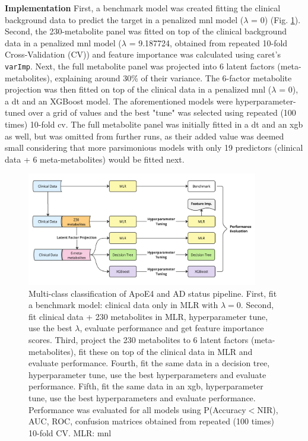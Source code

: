 \documentclass{amsart}
\begin{document}
\leavevmode\newline \textbf{Implementation}\hspace{.25cm} First, a benchmark model was created fitting the clinical background data to predict the target in a penalized \acrshort{mnl} model ($\lambda$ = 0) (Fig. \ref{fig:flow}). Second, the 230-metabolite panel was fitted on top of the clinical background data in a penalized \acrshort{mnl} model ($\lambda$ = 9.187724, obtained from repeated 10-fold Cross-Validation (CV)) and feature importance was calculated using \textsf{caret}'s \texttt{varImp}. Next, the full metabolite panel was projected into 6 latent factors (meta-metabolites), explaining around 30\% of their variance. The 6-factor metabolite projection was then fitted on top of the clinical data in a penalized \acrshort{mnl} ($\lambda$ = 0), a \acrlong{dt} and an XGBoost model. The aforementioned models were hyperparameter-tuned over a grid of values and the best "tune" was selected using repeated (100 times) 10-fold \acrshort{cv}. The full metabolite panel was initially fitted in a \acrshort{dt} and an \acrshort{xgb} as well, but was omitted from further runs, as their added value was deemed small considering that more parsimonious models with only 19 predictors (clinical data + 6 meta-metabolites) would be fitted next.
\begin{figure}[H]
  \includegraphics[width=0.9\textwidth]{figures/flowchart.pdf}
  \caption{\label{fig:flow} Multi-class classification of ApoE4 and AD status pipeline. First, fit a benchmark model: clinical data only in MLR with $\lambda=0$. Second, fit clinical data + 230 metabolites in MLR, hyperparameter tune, use the best $\lambda$, evaluate performance and get feature importance scores. Third, project the 230 metabolites to 6 latent factors (meta-metabolites), fit these on top of the clinical data in MLR and evaluate performance. Fourth, fit the same data in a decision tree, hyperparameter tune, use the best hyperparameters and evaluate performance. Fifth, fit the same data in an \acrfull{xgb}, hyperparameter tune, use the best hyperparameters and evaluate performance. Performance was evaluated for all models using P(Accuracy$<$NIR), AUC, ROC, confusion matrices obtained from repeated (100 times) 10-fold CV.
  MLR: \acrlong{mnl} \vspace{-20pt}}
\end{figure}
\end{document}
